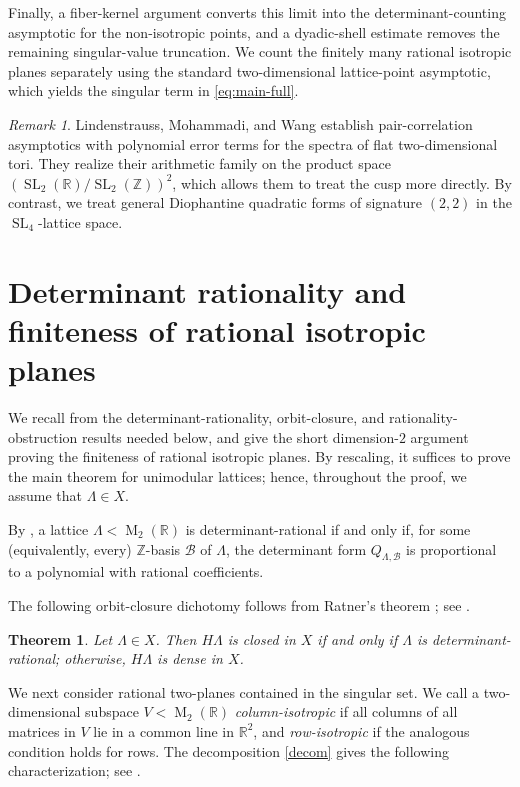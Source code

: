 \documentclass[reqno,11pt]{amsart}
\newtheorem{theorem}{Theorem}[section]
\theoremstyle{definition}
\theoremstyle{remark}
\newtheorem{remark}[remark]{Remark}
\numberwithin{equation}{section}
\newcommand{\M}{\operatorname{M}}
\newcommand{\SL}{\operatorname{SL}}
\begin{document}
Finally, a fiber-kernel argument converts this limit into the
determinant-counting asymptotic for the non-isotropic points, and a
dyadic-shell estimate removes the remaining singular-value truncation.
We count the finitely many rational isotropic planes separately using the
standard two-dimensional lattice-point asymptotic, which yields the
singular term in
\eqref{eq:main-full}.
\begin{remark}
Lindenstrauss, Mohammadi, and Wang \cite{LMW-flat-torus} establish
pair-correlation asymptotics with polynomial error terms for the spectra
of flat two-dimensional tori. They realize their arithmetic family on the
product space
$(\SL_2(\mathbb R)/\SL_2(\mathbb Z))^2$, which allows them to treat the
cusp more directly. By contrast, we treat general Diophantine quadratic
forms of signature $(2,2)$ in the $\SL_4$-lattice space.
\end{remark}


\section{Determinant rationality and finiteness of rational isotropic planes}
\label{sec:det-rational}
We recall from \cite{KimOh_det} the determinant-rationality,
orbit-closure, and rationality-obstruction results needed below, and give
the short dimension-$2$ argument proving the finiteness of rational
isotropic planes. By rescaling, it suffices to prove the main theorem for
unimodular lattices; hence, throughout the proof, we assume that
$\Lambda\in X$.

By \cite[Theorem~2.7]{KimOh_det}, a lattice
$\Lambda<\M_2(\mathbb R)$ is determinant-rational if and only if, for
some\/ (equivalently, every) $\mathbb Z$-basis $\mathcal B$ of $\Lambda$,
the determinant form $Q_{\Lambda,\mathcal B}$ is proportional to a
polynomial with rational coefficients.


The following orbit-closure dichotomy follows from Ratner's theorem
\cite{ratner:1991}; see \cite[Theorem~2.10]{KimOh_det}.

\begin{theorem}\label{thm:orbit-dichotomy-d2}
Let $\Lambda\in X$. Then $H\Lambda$ is closed in $X$ if and only if
$\Lambda$ is determinant-rational; otherwise, $H\Lambda$ is dense in
$X$.
\end{theorem}

We next consider rational two-planes contained in the singular set. We
call a two-dimensional subspace $V<\M_2(\mathbb R)$
\emph{column-isotropic} if all columns of all matrices in $V$ lie in a
common line in $\mathbb R^2$, and \emph{row-isotropic} if the analogous
condition holds for rows. The decomposition \eqref{decom} gives the
following characterization; see \cite[Lemma~3.2]{KimOh_det}.
\end{document}
